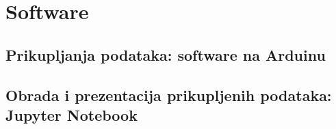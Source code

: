 \chapter{Software}
\section{Prikupljanja podataka: software na Arduinu}
\section{Obrada i prezentacija prikupljenih podataka: Jupyter Notebook}
